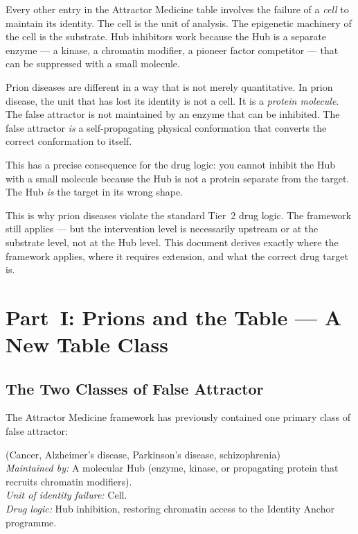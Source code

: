 \documentclass[12pt,a4paper]{article}
\begin{document}
Every other entry in the Attractor Medicine table involves the failure of a
\textit{cell} to maintain its identity. The cell is the unit of analysis.
The epigenetic machinery of the cell is the substrate. Hub inhibitors work
because the Hub is a separate enzyme --- a kinase, a chromatin modifier, a
pioneer factor competitor --- that can be suppressed with a small molecule.

Prion diseases are different in a way that is not merely quantitative. In
prion disease, the unit that has lost its identity is not a cell. It is a
\textit{protein molecule}. The false attractor is not maintained by an enzyme
that can be inhibited. The false attractor \textit{is} a self-propagating
physical conformation that converts the correct conformation to itself.

\vspace{0.5em}

This has a precise consequence for the drug logic: you cannot inhibit the
Hub with a small molecule because the Hub is not a protein separate from the
target. The Hub \textit{is} the target in its wrong shape.

This is why prion diseases violate the standard Tier~2 drug logic. The
framework still applies --- but the intervention level is necessarily upstream
or at the substrate level, not at the Hub level. This document derives
exactly where the framework applies, where it requires extension, and what
the correct drug target is.

\section{Part~I: Prions and the Table --- A New Table Class}

\subsection{The Two Classes of False Attractor}

The Attractor Medicine framework has previously contained one primary class
of false attractor:

\begin{description}[leftmargin=2em]
  \item[\textbf{Class~1 --- Epigenetic False Attractor}]
    (Cancer, Alzheimer's disease, Parkinson's disease, schizophrenia)\\
    \textit{Maintained by:} A molecular Hub (enzyme, kinase, or propagating
    protein that recruits chromatin modifiers).\\
    \textit{Unit of identity failure:} Cell.\\
    \textit{Drug logic:} Hub inhibition, restoring chromatin access to the
    Identity Anchor programme.
\end{description}
\end{document}
